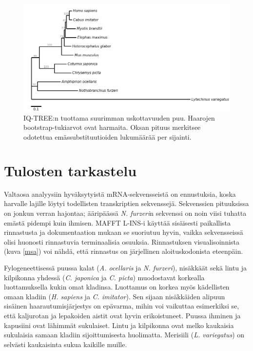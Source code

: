 \documentclass[a4paper,11pt,notitlepage]{article}
\begin{document}
\begin{figure}[!h]
	\centering
	\includegraphics[width=\textwidth]{tree.png}
	\caption{IQ-TREE:n tuottama suurimman uskottavuuden puu. Haarojen bootstrap-tukiarvot ovat harmaita. Oksan pituus merkitsee odotettua emässubstituutioiden lukumäärää per sijainti.} \label{puu}
\end{figure}

\section{Tulosten tarkastelu}
Valtaosa analyysiin hyväksytyistä mRNA-sekvensseistä on ennustuksia, koska harvalle lajille löytyi todellisten transkriptien sekvenssejä. Sekvenssien pituuksissa on jonkun verran hajontaa; ääripäässä \textit{N. furzeri}n sekvenssi on noin viisi tuhatta emästä pidempi kuin ihmisen. MAFFT L-INS-i käyttää sisäisesti paikallista rinnastusta ja dokumentaation mukaan se suoriutuu hyvin, vaikka sekvensseissä olisi huonosti rinnastuvia terminaalisia osuuksia. Rinnastuksen visualisoinnista (kuva \ref{msa}) voi nähdä, että rinnastus on järjellinen aloituskodonista eteenpäin.

Fylogeneettisessä puussa kalat (\textit{A. ocellaris} ja \textit{N. furzeri}), nisäkkäät sekä lintu ja kilpikonna yhdessä (\textit{C. japonica} ja \textit{C. picta}) muodostavat korkealla luottamuksella kukin omat kladinsa. Luottamus on korkea myös kädellisten omaan kladiin (\textit{H. sapiens} ja \textit{C. imitator}). Sen sijaan nisäkkäiden alipuun sisäinen haarautumisjärjestys on epävarma, mihin voi vaikuttaa esimerkiksi se, että kaljurotan ja lepakoiden aistit ovat hyvin erikoistuneet. Puussa ihminen ja kapusiini ovat lähimmät sukulaiset. Lintu ja kilpikonna ovat melko kaukaisia sukulaisia samaan kladiin sijoittumisesta huolimatta. Merisiili (\textit{L. variegatus}) on selvästi kaukaisinta sukua kaikille muille.
\end{document}
